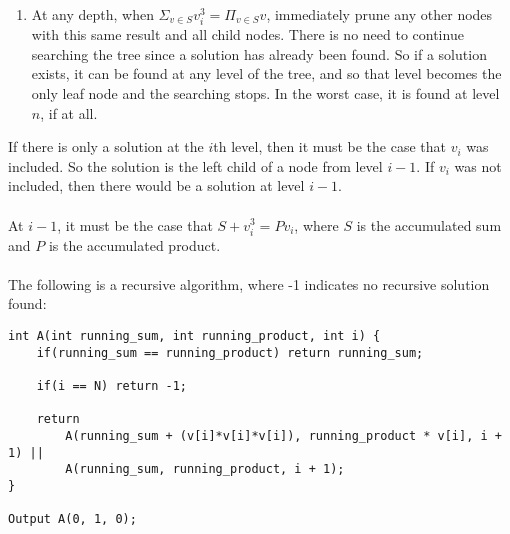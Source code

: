 \documentclass[letterpaper,notitlepage,twoside]{article}
\begin{document}
\begin{enumerate}
\item At any depth, when $\Sigma_{v \in S} v_i^3 = \Pi_{v \in S} v$, immediately prune any other nodes with this same result and all child nodes. There is no need to continue searching the tree since a solution has already been found. So if a solution exists, it can be found at any level of the tree, and so that level becomes the only leaf node and the searching stops. In the worst case, it is found at level $n$, if at all.
\end{enumerate}

If there is only a solution at the $i$th level, then it must be the case that $v_i$ was included. So the solution is the left child of a node from level $i - 1$. If $v_i$ was not included, then there would be a solution at level $i - 1$.\\\\

At $i - 1$, it must be the case that $S + v_i^3 = Pv_i$, where $S$ is the accumulated sum and $P$ is the accumulated product.\\\\

The following is a recursive algorithm, where -1 indicates no recursive solution found:
\begin{verbatim}
int A(int running_sum, int running_product, int i) {
    if(running_sum == running_product) return running_sum;
	
    if(i == N) return -1;

    return
        A(running_sum + (v[i]*v[i]*v[i]), running_product * v[i], i + 1) ||
        A(running_sum, running_product, i + 1);		
}

Output A(0, 1, 0);
\end{verbatim}
\end{document}
